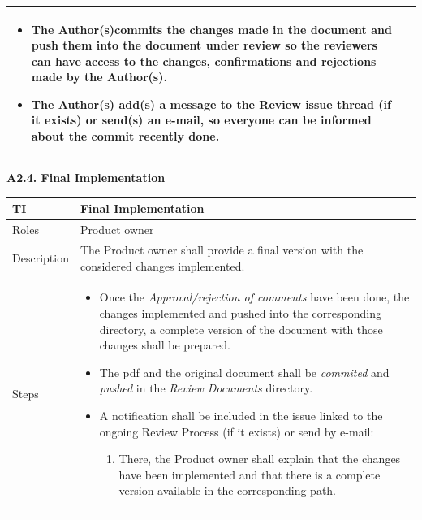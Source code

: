 \documentclass{template/openetcs_article}
\begin{document}
\begin{flushleft}
\begin{supertabular}{|m{2cm}|m{13cm}|}
\begin{itemize}
\begin{enumerate}
\begin{enumerate}
\end{enumerate}
\end{enumerate}
\item The Author(s)commits the changes made in the document and push them into the document under review so the reviewers can have access to the changes, confirmations and rejections made by the Author(s).
\item The Author(s) add(s) a message to the Review issue thread (if it exists) or send(s) an e-mail, so everyone can be informed about the commit recently done. 
\end{itemize}
\\\hline
\end{supertabular}
\end{flushleft}

\textbf{A2.4. Final Implementation}

\begin{flushleft}
\tablefirsthead{}
\tablehead{}
\tabletail{}
\tablelasttail{}
\begin{supertabular}[H]{|m{2cm}|m{13cm}|}
\hline
{}
TI & 
Final Implementation
\\\hline
Roles &
Product owner
\\\hline
Description &
The Product owner shall provide a final version with the considered changes implemented.  
\\\hline
Steps &
\begin{itemize}
\item Once the {\it Approval/rejection of comments} have been done, the changes implemented and pushed into the corresponding directory, a complete version of the document with those changes shall be prepared.
\item The pdf and the original document shall be {\it commited} and {\it pushed} in the {\it Review Documents} directory.
\item A notification shall be included in the issue linked to the ongoing Review Process (if it exists) or send by e-mail: 
\begin{enumerate}
\item There, the Product owner shall explain that the changes have been implemented and that there is a complete version available in the corresponding path.
\end{enumerate}
\end{itemize}
\\\hline
\end{supertabular}
\end{flushleft}
\end{document}
